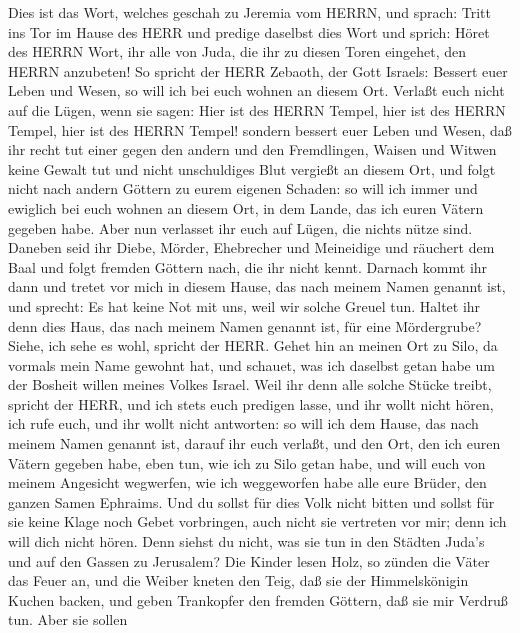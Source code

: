  Dies ist das Wort, welches geschah zu Jeremia vom HERRN,
und sprach:  Tritt ins Tor im Hause des HERR und predige
daselbst dies Wort und sprich: Höret des HERRN Wort, ihr alle von Juda,
die ihr zu diesen Toren eingehet, den HERRN anzubeten!  So
spricht der HERR Zebaoth, der Gott Israels: Bessert euer Leben und
Wesen, so will ich bei euch wohnen an diesem Ort.  Verlaßt
euch nicht auf die Lügen, wenn sie sagen: Hier ist des HERRN Tempel,
hier ist des HERRN Tempel, hier ist des HERRN Tempel! 
sondern bessert euer Leben und Wesen, daß ihr recht tut einer gegen den
andern  und den Fremdlingen, Waisen und Witwen keine Gewalt
tut und nicht unschuldiges Blut vergießt an diesem Ort, und folgt nicht
nach andern Göttern zu eurem eigenen Schaden:  so will ich
immer und ewiglich bei euch wohnen an diesem Ort, in dem Lande, das ich
euren Vätern gegeben habe.  Aber nun verlasset ihr euch auf
Lügen, die nichts nütze sind.  Daneben seid ihr Diebe,
Mörder, Ehebrecher und Meineidige und räuchert dem Baal und folgt
fremden Göttern nach, die ihr nicht kennt.  Darnach kommt
ihr dann und tretet vor mich in diesem Hause, das nach meinem Namen
genannt ist, und sprecht: Es hat keine Not mit uns, weil wir solche
Greuel tun.  Haltet ihr denn dies Haus, das nach meinem
Namen genannt ist, für eine Mördergrube? Siehe, ich sehe es wohl,
spricht der HERR.  Gehet hin an meinen Ort zu Silo, da
vormals mein Name gewohnt hat, und schauet, was ich daselbst getan habe
um der Bosheit willen meines Volkes Israel.  Weil ihr denn
alle solche Stücke treibt, spricht der HERR, und ich stets euch predigen
lasse, und ihr wollt nicht hören, ich rufe euch, und ihr wollt nicht
antworten:  so will ich dem Hause, das nach meinem Namen
genannt ist, darauf ihr euch verlaßt, und den Ort, den ich euren Vätern
gegeben habe, eben tun, wie ich zu Silo getan habe,  und
will euch von meinem Angesicht wegwerfen, wie ich weggeworfen habe alle
eure Brüder, den ganzen Samen Ephraims.  Und du sollst für
dies Volk nicht bitten und sollst für sie keine Klage noch Gebet
vorbringen, auch nicht sie vertreten vor mir; denn ich will dich nicht
hören.  Denn siehst du nicht, was sie tun in den Städten
Juda's und auf den Gassen zu Jerusalem?  Die Kinder lesen
Holz, so zünden die Väter das Feuer an, und die Weiber kneten den Teig,
daß sie der Himmelskönigin Kuchen backen, und geben Trankopfer den
fremden Göttern, daß sie mir Verdruß tun.  Aber sie sollen
